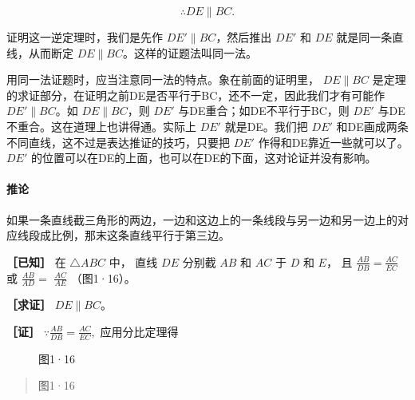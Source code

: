 \[
\therefore D E \parallel B C.
\]

证明这一逆定理时，我们是先作 \(DE' \parallel BC\)，然后推出 \(DE'\) 和
\(DE\) 就是同一条直线，从而断定
\(DE \parallel BC\)。这样的证题法叫同一法。

用同一法证题时，应当注意同一法的特点。象在前面的证明里，
\(DE \parallel BC\)
是定理的求证部分，在证明之前DE是否平行于BC，还不一定，因此我们才有可能作
\(DE' \parallel BC\)。如 \(DE \parallel BC\)，则 \(DE'\)
与DE重合；如DE不平行于BC，则 \(DE'\)
与DE不重合。这在道理上也讲得通。实际上 \(DE'\) 就是DE。我们把 \(DE'\)
和DE画成两条不同直线，这不过是表达推证的技巧，只要把 \(DE'\)
作得和DE靠近一些就可以了。 \(DE'\)
的位置可以在DE的上面，也可以在DE的下面，这对论证并没有影响。

\paragraph{推论}

如果一条直线截三角形的两边，一边和这边上的一条线段与另一边和另一边上的对应线段成比例，那末这条直线平行于第三边。

\textbf{［已知］} 在 \(\triangle ABC\) 中， 直线 \(DE\) 分别截 \(AB\) 和
\(AC\) 于 \(D\) 和 \(E\)， 且 \(\frac{AB}{DB} = \frac{AC}{EC}\) 或
\(\frac{AB}{AD} =\) \(\frac{AC}{AE}\) （图1·16）。

\textbf{［求证］} \(DE \parallel BC\)。

\textbf{［证］} \(\because \frac{AB}{DB} = \frac{AC}{EC},\)
应用分比定理得

\begin{figure}
\centering
{}
\caption{图1·16}
\end{figure}

\begin{quote}
图1·16
\end{quote}

